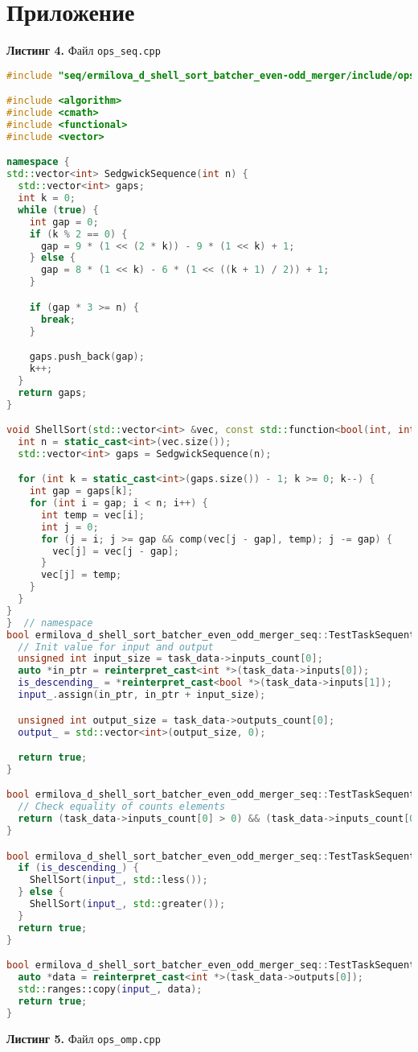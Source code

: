 \documentclass[a4paper,12pt]{article}
\begin{document}
\section{Приложение}
\textbf{Листинг 4.} Файл \texttt{ops\_seq.cpp}
\begin{lstlisting}[language=C++]
#include "seq/ermilova_d_shell_sort_batcher_even-odd_merger/include/ops_seq.hpp"

#include <algorithm>
#include <cmath>
#include <functional>
#include <vector>

namespace {
std::vector<int> SedgwickSequence(int n) {
  std::vector<int> gaps;
  int k = 0;
  while (true) {
    int gap = 0;
    if (k % 2 == 0) {
      gap = 9 * (1 << (2 * k)) - 9 * (1 << k) + 1;
    } else {
      gap = 8 * (1 << k) - 6 * (1 << ((k + 1) / 2)) + 1;
    }

    if (gap * 3 >= n) {
      break;
    }

    gaps.push_back(gap);
    k++;
  }
  return gaps;
}

void ShellSort(std::vector<int> &vec, const std::function<bool(int, int)> &comp) {
  int n = static_cast<int>(vec.size());
  std::vector<int> gaps = SedgwickSequence(n);

  for (int k = static_cast<int>(gaps.size()) - 1; k >= 0; k--) {
    int gap = gaps[k];
    for (int i = gap; i < n; i++) {
      int temp = vec[i];
      int j = 0;
      for (j = i; j >= gap && comp(vec[j - gap], temp); j -= gap) {
        vec[j] = vec[j - gap];
      }
      vec[j] = temp;
    }
  }
}
}  // namespace
bool ermilova_d_shell_sort_batcher_even_odd_merger_seq::TestTaskSequential::PreProcessingImpl() {
  // Init value for input and output
  unsigned int input_size = task_data->inputs_count[0];
  auto *in_ptr = reinterpret_cast<int *>(task_data->inputs[0]);
  is_descending_ = *reinterpret_cast<bool *>(task_data->inputs[1]);
  input_.assign(in_ptr, in_ptr + input_size);

  unsigned int output_size = task_data->outputs_count[0];
  output_ = std::vector<int>(output_size, 0);

  return true;
}

bool ermilova_d_shell_sort_batcher_even_odd_merger_seq::TestTaskSequential::ValidationImpl() {
  // Check equality of counts elements
  return (task_data->inputs_count[0] > 0) && (task_data->inputs_count[0] == task_data->outputs_count[0]);
}

bool ermilova_d_shell_sort_batcher_even_odd_merger_seq::TestTaskSequential::RunImpl() {
  if (is_descending_) {
    ShellSort(input_, std::less());
  } else {
    ShellSort(input_, std::greater());
  }
  return true;
}

bool ermilova_d_shell_sort_batcher_even_odd_merger_seq::TestTaskSequential::PostProcessingImpl() {
  auto *data = reinterpret_cast<int *>(task_data->outputs[0]);
  std::ranges::copy(input_, data);
  return true;
}
\end{lstlisting}
\textbf{Листинг 5.} Файл \texttt{ops\_omp.cpp}
\end{document}
